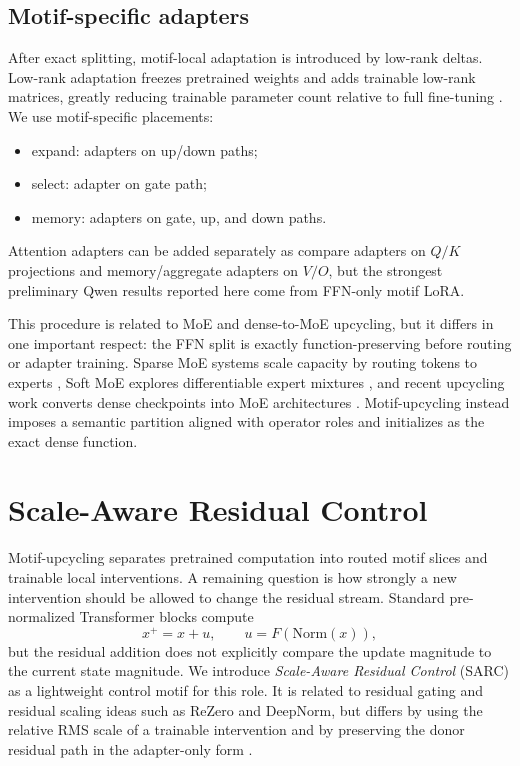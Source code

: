 \documentclass[11pt]{article}
\theoremstyle{definition}
\begin{document}
\subsection{Motif-specific adapters}

After exact splitting, motif-local adaptation is introduced by low-rank deltas. Low-rank adaptation freezes pretrained weights and adds trainable low-rank matrices, greatly reducing trainable parameter count relative to full fine-tuning \cite{hu2021}. We use motif-specific placements:
\begin{itemize}
  \item expand: adapters on up/down paths;
  \item select: adapter on gate path;
  \item memory: adapters on gate, up, and down paths.
\end{itemize}
Attention adapters can be added separately as compare adapters on \(Q/K\) projections and memory/aggregate adapters on \(V/O\), but the strongest preliminary Qwen results reported here come from FFN-only motif LoRA.

This procedure is related to MoE and dense-to-MoE upcycling, but it differs in one important respect: the FFN split is exactly function-preserving before routing or adapter training. Sparse MoE systems scale capacity by routing tokens to experts \cite{fedus2021}, Soft MoE explores differentiable expert mixtures \cite{puigcerver2023}, and recent upcycling work converts dense checkpoints into MoE architectures \cite{he2024}. Motif-upcycling instead imposes a semantic partition aligned with operator roles and initializes as the exact dense function.


\section{Scale-Aware Residual Control}

Motif-upcycling separates pretrained computation into routed motif slices and trainable local interventions. A remaining question is how strongly a new intervention should be allowed to change the residual stream. Standard pre-normalized Transformer blocks compute
\[
  x^+ = x+u,\qquad u=F(\mathrm{Norm}(x)),
\]
but the residual addition does not explicitly compare the update magnitude to the current state magnitude. We introduce \emph{Scale-Aware Residual Control} (SARC) as a lightweight control motif for this role. It is related to residual gating and residual scaling ideas such as ReZero and DeepNorm, but differs by using the relative RMS scale of a trainable intervention and by preserving the donor residual path in the adapter-only form \cite{bachlechner2020,wang2022deepnet}.
\end{document}
